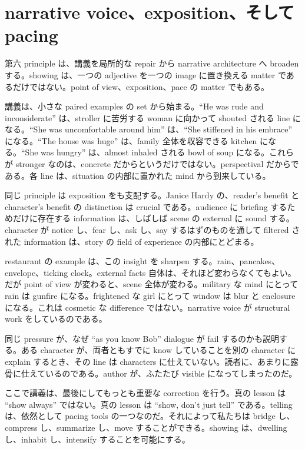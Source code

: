 \section{narrative voice、exposition、そして pacing}

第六 principle は、講義を局所的な repair から narrative architecture へ broaden する。showing は、一つの adjective を一つの image に置き換える matter であるだけではない。point of view、exposition、pace の matter でもある。

講義は、小さな paired examples の set から始まる。``He was rude and inconsiderate'' は、stroller に苦労する woman に向かって shouted される line になる。``She was uncomfortable around him'' は、``She stiffened in his embrace'' になる。``The house was huge'' は、family 全体を収容できる kitchen になる。``She was hungry'' は、almost inhaled される bowl of soup になる。これらが stronger なのは、concrete だからというだけではない。perspectival だからである。各 line は、situation の内部に置かれた mind から到来している。

同じ principle は exposition をも支配する。Janice Hardy の、reader's benefit と character's benefit の distinction は crucial である。audience に briefing するためだけに存在する information は、しばしば scene の external に sound する。character が notice し、fear し、ask し、say するはずのものを通して filtered された information は、story の field of experience の内部にとどまる。

restaurant の example は、この insight を sharpen する。rain、pancakes、envelope、ticking clock。external facts 自体は、それほど変わらなくてもよい。だが point of view が変わると、scene 全体が変わる。military な mind にとって rain は gunfire になる。frightened な girl にとって window は blur と enclosure になる。これは cosmetic な difference ではない。narrative voice が structural work をしているのである。

同じ pressure が、なぜ ``as you know Bob'' dialogue が fail するのかも説明する。ある character が、両者ともすでに know していることを別の character に explain するとき、その line は characters に仕えていない。読者に、あまりに露骨に仕えているのである。author が、ふたたび visible になってしまったのだ。

ここで講義は、最後にしてもっとも重要な correction を行う。真の lesson は ``show always'' ではない。真の lesson は ``show, don't just tell'' である。telling は、依然として pacing tools の一つなのだ。それによって私たちは bridge し、compress し、summarize し、move することができる。showing は、dwelling し、inhabit し、intensify することを可能にする。

